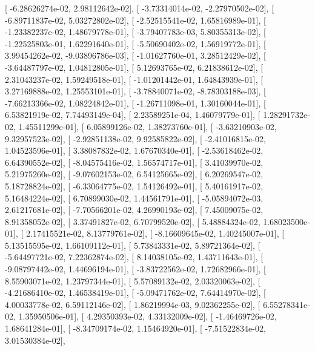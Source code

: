 \documentclass{article}
\begin{document}
       [ -6.28626274e-02,   2.98112642e-02],
       [ -3.73314014e-02,  -2.27970502e-02],
       [ -6.89711837e-02,   5.03272802e-02],
       [ -2.52515541e-02,   1.65816989e-01],
       [ -1.23382237e-02,   1.48679778e-01],
       [ -3.79407783e-03,   5.80355313e-02],
       [ -1.22525803e-01,   1.62291640e-01],
       [ -5.50690402e-02,   1.56919772e-01],
       [  3.99454262e-02,  -9.03896786e-03],
       [ -1.01627760e-01,   3.28512429e-02],
       [ -3.64487797e-02,   1.04812805e-01],
       [  5.12693765e-02,   6.21838612e-02],
       [  2.31043237e-02,   1.59249518e-01],
       [ -1.01201442e-01,   1.64843939e-01],
       [  3.27169888e-02,   1.25553101e-01],
       [ -3.78840071e-02,  -8.78303188e-03],
       [ -7.66213366e-02,   1.08224842e-01],
       [ -1.26711098e-01,   1.30160044e-01],
       [  6.53821919e-02,   7.74493149e-04],
       [  2.23589251e-04,   1.46079779e-01],
       [  1.28291732e-02,   1.45511299e-01],
       [  6.05899126e-02,   1.38273760e-01],
       [ -3.63210903e-02,   9.32957523e-02],
       [ -2.92851138e-02,   9.92585822e-02],
       [ -2.41016815e-02,   1.04523596e-01],
       [  3.38087832e-02,   1.67670340e-01],
       [ -2.53618462e-02,   6.64390552e-02],
       [ -8.04575416e-02,   1.56574717e-01],
       [  3.41039970e-02,   5.21975260e-02],
       [ -9.07602153e-02,   6.54125665e-02],
       [  6.20269547e-02,   5.18728824e-02],
       [ -6.33064775e-02,   1.54126492e-01],
       [  5.40161917e-02,   5.16484224e-02],
       [  6.70899030e-02,   1.44561791e-01],
       [ -5.05894072e-03,   2.61217681e-02],
       [ -7.70566201e-02,   4.26990193e-02],
       [  7.45009075e-02,   8.91358052e-02],
       [  3.37491827e-02,   6.70799520e-02],
       [  5.48884324e-02,   1.68023500e-01],
       [  2.17415521e-02,   8.13779761e-02],
       [ -8.16609645e-02,   1.40245007e-01],
       [  5.13515595e-02,   1.66109112e-01],
       [  5.73843331e-02,   5.89721364e-02],
       [ -5.64497721e-02,   7.22362874e-02],
       [  8.14038105e-02,   1.43711643e-01],
       [ -9.08797442e-02,   1.44696194e-01],
       [ -3.83722562e-02,   1.72682966e-01],
       [  8.55903071e-02,   1.23797344e-01],
       [  5.57089132e-02,   2.03320063e-02],
       [ -4.21686410e-02,   1.46538419e-01],
       [ -5.09471762e-02,   7.64414970e-02],
       [  4.00033778e-02,   6.59112146e-02],
       [  1.86219994e-03,   9.02362255e-02],
       [  6.55278341e-02,   1.35950506e-01],
       [  4.29350393e-02,   4.33132009e-02],
       [ -1.46469726e-02,   1.68641284e-01],
       [ -8.34709174e-02,   1.15464920e-01],
       [ -7.51522834e-02,   3.01530384e-02],
\end{document}
